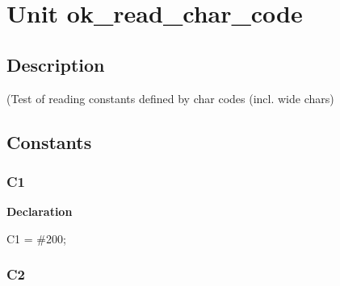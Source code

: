\documentclass{report}
\newif\ifpdf
\begin{document}
\label{toc}\tableofcontents
\newpage
\newlength{\tmplength}
\chapter{Unit ok{\_}read{\_}char{\_}code}
\label{ok_read_char_code}
\section{Description}
(Test of reading constants defined by char codes (incl. wide chars)
\section{Constants}
\ifpdf
\subsection*{\large{\textbf{C1}}\normalsize\hspace{1ex}\hrulefill}
\else
\subsection*{C1}
\fi
\label{ok_read_char_code-C1}
\begin{list}{}{
\setlength{\itemindent}{0cm}
\setlength{\listparindent}{0cm}
\setlength{\leftmargin}{\evensidemargin}
\addtolength{\leftmargin}{\tmplength}
\settowidth{\labelsep}{X}
\addtolength{\leftmargin}{\labelsep}
\setlength{\labelwidth}{\tmplength}
}
\item[\textbf{Declaration}\hfill]
\ifpdf
\begin{flushleft}
\fi
\begin{ttfamily}
C1 = {\#}200;\end{ttfamily}

\ifpdf
\end{flushleft}
\fi

\end{list}
\ifpdf
\subsection*{\large{\textbf{C2}}\normalsize\hspace{1ex}\hrulefill}
\else
\end{document}
